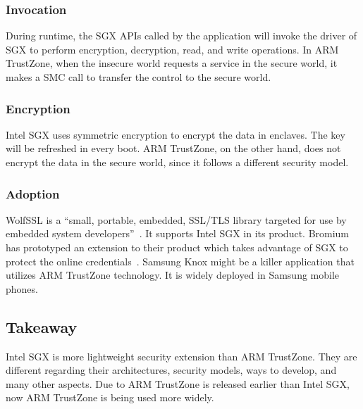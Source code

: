 \subsubsection{Invocation}
During runtime, the SGX APIs called by the application will invoke
the driver of SGX to perform encryption, decryption, read, and write
operations. In ARM TrustZone, when the insecure world requests a service
in the secure world, it makes a SMC call to transfer the control to
the secure world.    



\subsubsection{Encryption}
Intel SGX uses symmetric encryption to encrypt the data in 
enclaves. The key will be refreshed in every boot. ARM TrustZone,
on the other hand, does not encrypt the data in the secure world,
since it follows a different security model.      



\subsubsection{Adoption}
WolfSSL is a ``small, portable, embedded, SSL/TLS library targeted
for use by embedded system developers''~\cite{wolfssl}. It supports Intel SGX in
its product. Bromium has prototyped an extension to their product 
which takes advantage of SGX to protect the online credentials~\cite{bromium}.
Samsung Knox might be a killer application that utilizes ARM TrustZone
technology. It is widely deployed in Samsung mobile phones. 


\subsection{Takeaway}
Intel SGX is more lightweight security extension than ARM TrustZone.
They are different regarding their architectures, security models,
ways to develop, and many other aspects. Due to ARM TrustZone is released
earlier than Intel SGX, now ARM TrustZone is being used more widely.   




